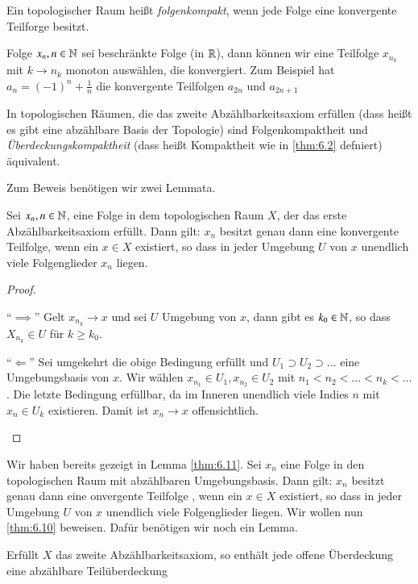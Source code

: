\documentclass[a4paper,10pt]{scrartcl}
\begin{document}
\begin{df}\label{thm:6.9}
 Ein topologischer Raum heißt \emph{folgenkompakt}, wenn jede Folge eine konvergente Teilforge besitzt.  
\end{df}
\begin{ex*}
 Folge $x_n, n\in \mathbb{N}$ sei beschränkte Folge (in $ \mathbb{R} $), dann können wir eine Teilfolge $x_{n_k}$ mit $k\to n_k$ monoton auswählen, die konvergiert. Zum Beispiel hat $a_n=(-1)^n+\frac 1 n$ die konvergente Teilfolgen $a_{2n}$ und $a_{2n+1}$
\end{ex*}
\begin{st}\label{thm:6.10}
 In topologischen Räumen, die das zweite Abzählbarkeitsaxiom erfüllen (dass heißt es gibt eine abzählbare Basis der Topologie) sind Folgenkompaktheit und \emph{Überdeckungskompaktheit} (dass heißt Kompaktheit wie in \ref{thm:6.2} defniert) äquivalent.
\end{st}
Zum Beweis benötigen wir zwei Lemmata.
\begin{lem}\label{thm:6.11}
 Sei $x_n, n\in \mathbb{N}$, eine Folge in dem topologischen Raum $X$, der das erste Abzählbarkeitsaxiom erfüllt.  Dann gilt: $x_n$ besitzt genau dann eine konvergente Teilfolge, wenn ein $x\in X$ existiert, so dass in jeder Umgebung $U$ von $x$ unendlich viele Folgenglieder $x_n$ liegen.
\end{lem}
\begin{proof}
 \begin{seg}{"`$\implies$"'}
  Gelt $x_{n_k}\to x$ und sei $U$ Umgebung von $x$, dann gibt es $k_0\in \mathbb{N}$, so dass $X_{n_k}\in U$ für $k\ge k_0$.
 \end{seg}
\begin{seg}{"`$\Longleftarrow$"'}
 Sei umgekehrt die obige Bedingung erfüllt und $U_1\supset U_2 \supset ...$ eine Umgebungsbasis von $x$. Wir wählen
$x_{n_1}\in U_1, x_{n_2}\in U_2$ mit $n_1<n_2<...<n_k<...$. Die letzte Bedingung erfüllbar, da im Inneren unendlich viele Indies $n$ mit $x_n\in U_k$ existieren. Damit ist $x_n\to x$ offensichtlich.
\end{seg}
\end{proof}
 Wir haben bereits gezeigt in Lemma \ref{thm:6.11}. Sei $x_n$ eine Folge in den topologischen Raum  mit abzählbaren Umgebungsbasis. Dann gilt: $x_n$ besitzt genau dann eine onvergente Teilfolge , wenn ein $x\in X$ existiert, so dass 
in jeder Umgebung $U$ von $x$ unendlich viele Folgenglieder liegen. Wir wollen nun \ref{thm:6.10} beweisen. Dafür benötigen wir noch ein Lemma.
\begin{lem}\label{thm:6.12}
 Erfüllt $X$ das zweite Abzählbarkeitsaxiom,  so enthält jede offene Überdeckung eine abzählbare Teilüberdeckung
\end{lem}
\end{document}
